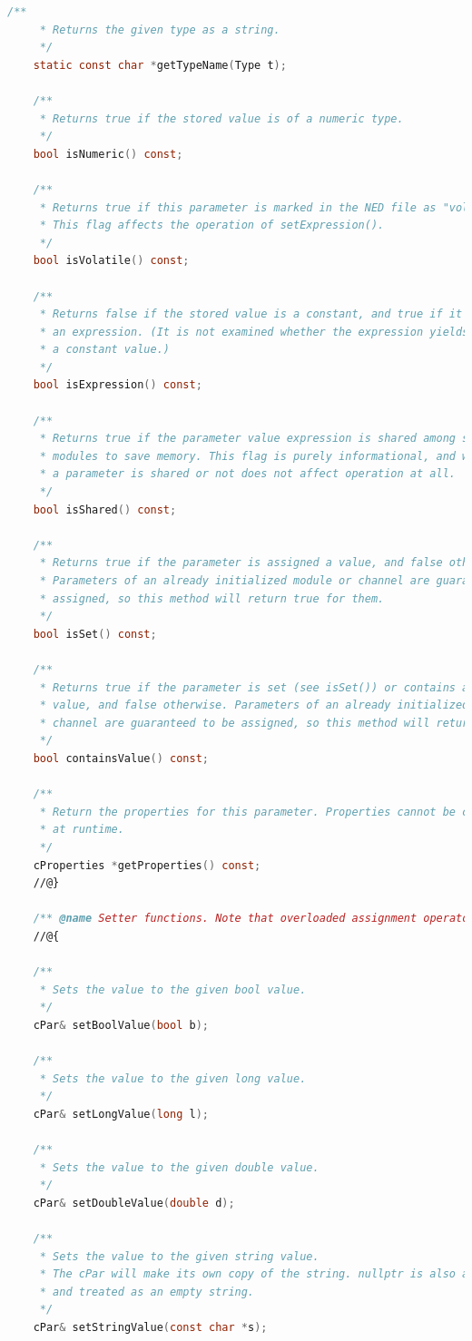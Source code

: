 \begin{lstlisting}[language=c]
    /**
     * Returns the given type as a string.
     */
    static const char *getTypeName(Type t);

    /**
     * Returns true if the stored value is of a numeric type.
     */
    bool isNumeric() const;

    /**
     * Returns true if this parameter is marked in the NED file as "volatile".
     * This flag affects the operation of setExpression().
     */
    bool isVolatile() const;

    /**
     * Returns false if the stored value is a constant, and true if it is
     * an expression. (It is not examined whether the expression yields
     * a constant value.)
     */
    bool isExpression() const;

    /**
     * Returns true if the parameter value expression is shared among several
     * modules to save memory. This flag is purely informational, and whether
     * a parameter is shared or not does not affect operation at all.
     */
    bool isShared() const;

    /**
     * Returns true if the parameter is assigned a value, and false otherwise.
     * Parameters of an already initialized module or channel are guaranteed to
     * assigned, so this method will return true for them.
     */
    bool isSet() const;

    /**
     * Returns true if the parameter is set (see isSet()) or contains a default
     * value, and false otherwise. Parameters of an already initialized module or
     * channel are guaranteed to be assigned, so this method will return true for them.
     */
    bool containsValue() const;

    /**
     * Return the properties for this parameter. Properties cannot be changed
     * at runtime.
     */
    cProperties *getProperties() const;
    //@}

    /** @name Setter functions. Note that overloaded assignment operators also exist. */
    //@{

    /**
     * Sets the value to the given bool value.
     */
    cPar& setBoolValue(bool b);

    /**
     * Sets the value to the given long value.
     */
    cPar& setLongValue(long l);

    /**
     * Sets the value to the given double value.
     */
    cPar& setDoubleValue(double d);

    /**
     * Sets the value to the given string value.
     * The cPar will make its own copy of the string. nullptr is also accepted
     * and treated as an empty string.
     */
    cPar& setStringValue(const char *s);


\end{lstlisting}
